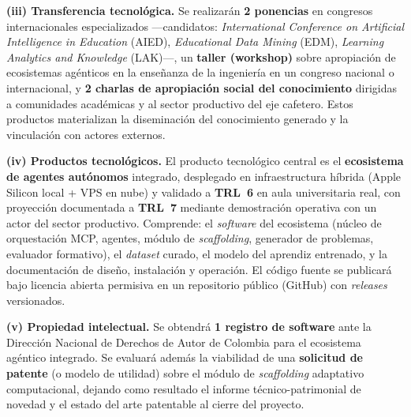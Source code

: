 \medskip

\noindent\textbf{(iii) Transferencia tecnológica.}
Se realizarán \textbf{2 ponencias} en congresos internacionales especializados
—candidatos: \emph{International Conference on Artificial Intelligence in
Education} (AIED), \emph{Educational Data Mining} (EDM), \emph{Learning
Analytics and Knowledge} (LAK)—, un \textbf{taller (workshop)} sobre apropiación
de ecosistemas agénticos en la enseñanza de la ingeniería en un congreso
nacional o internacional, y \textbf{2 charlas de apropiación social del
conocimiento} dirigidas a comunidades académicas y al sector productivo del eje
cafetero. Estos productos materializan la diseminación del conocimiento generado
y la vinculación con actores externos.

\medskip

\noindent\textbf{(iv) Productos tecnológicos.}
El producto tecnológico central es el \textbf{ecosistema de agentes autónomos}
integrado, desplegado en infraestructura híbrida (Apple Silicon local + VPS en
nube) y validado a \textbf{TRL~6} en aula universitaria real, con proyección
documentada a \textbf{TRL~7} mediante demostración operativa con un actor del
sector productivo. Comprende: el \emph{software} del ecosistema (núcleo de
orquestación MCP, agentes, módulo de \emph{scaffolding}, generador de problemas,
evaluador formativo), el \emph{dataset} curado, el modelo del aprendiz
entrenado, y la documentación de diseño, instalación y operación. El código
fuente se publicará bajo licencia abierta permisiva en un repositorio público
(GitHub) con \emph{releases} versionados.

\medskip

\noindent\textbf{(v) Propiedad intelectual.}
Se obtendrá \textbf{1 registro de software} ante la Dirección Nacional de
Derechos de Autor de Colombia para el ecosistema agéntico integrado. Se evaluará
además la viabilidad de una \textbf{solicitud de patente} (o modelo de utilidad)
sobre el módulo de \emph{scaffolding} adaptativo computacional, dejando como
resultado el informe técnico-patrimonial de novedad y el estado del arte
patentable al cierre del proyecto.

\medskip

